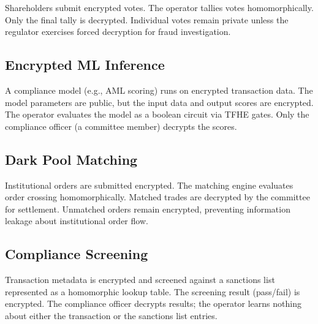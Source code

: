 Shareholders submit encrypted votes.  The operator tallies votes
homomorphically.  Only the final tally is decrypted.  Individual votes
remain private unless the regulator exercises forced decryption for
fraud investigation.

\subsection{Encrypted ML Inference}

A compliance model (e.g., AML scoring) runs on encrypted transaction
data.  The model parameters are public, but the input data and output
scores are encrypted.  The operator evaluates the model as a boolean
circuit via TFHE gates.  Only the compliance officer (a committee
member) decrypts the scores.

\subsection{Dark Pool Matching}

Institutional orders are submitted encrypted.  The matching engine
evaluates order crossing homomorphically.  Matched trades are decrypted
by the committee for settlement.  Unmatched orders remain encrypted,
preventing information leakage about institutional order flow.

\subsection{Compliance Screening}

Transaction metadata is encrypted and screened against a sanctions list
represented as a homomorphic lookup table.  The screening result
(pass/fail) is encrypted.  The compliance officer decrypts results; the
operator learns nothing about either the transaction or the sanctions
list entries.

